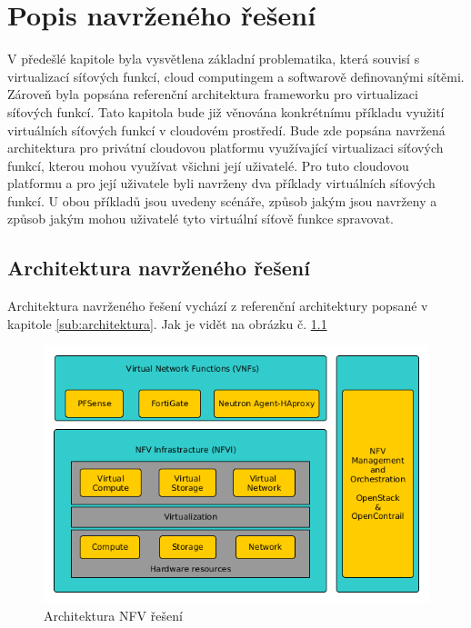 \chapter{Popis navrženého řešení}

V předešlé kapitole byla vysvětlena základní problematika, která souvisí s virtualizací síťových funkcí, cloud computingem a softwarově definovanými sítěmi. Zároveň byla popsána referenční architektura frameworku pro virtualizaci síťových funkcí. Tato kapitola bude již věnována konkrétnímu příkladu využití virtuálních síťových funkcí v cloudovém prostředí. Bude zde popsána navržená architektura pro privátní cloudovou platformu využívající virtualizaci síťových funkcí, kterou mohou využívat všichni její uživatelé. Pro tuto cloudovou platformu a pro její uživatele byli navrženy dva příklady virtuálních síťových funkcí. U obou příkladů jsou uvedeny scénáře, způsob jakým jsou navrženy a způsob jakým mohou uživatelé tyto virtuální síťově funkce spravovat.

\section{Architektura navrženého řešení}

Architektura navrženého řešení vychází z referenční architektury popsané v kapitole \ref{sub:architektura}. Jak je vidět na obrázku č. \ref{fig:VNF_overview}


\begin{figure}[h]
\begin{centering}
\includegraphics[scale=0.51]{images/VNF_overview}
\par\end{centering}
\caption{Architektura NFV řešení\label{fig:VNF_overview}}
\end{figure}


